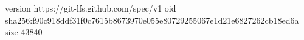 version https://git-lfs.github.com/spec/v1
oid sha256:f90c918ddf31f0c7615b8673970e055e80729255067e1d21e6827262cb18ed6a
size 43840
